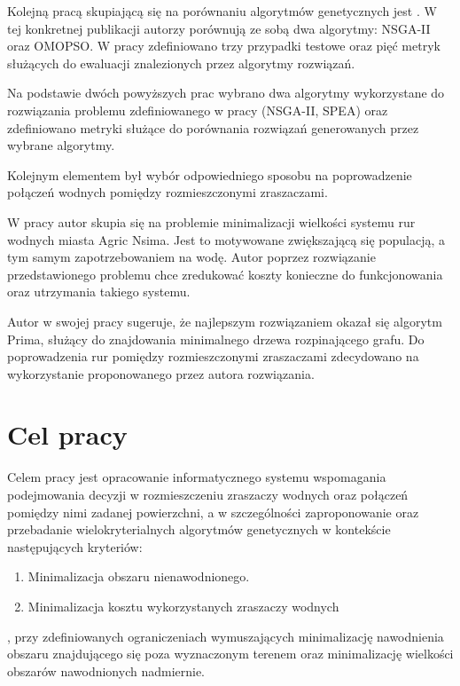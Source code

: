 \documentclass[twoside]{iisthesis}
\begin{document}
Kolejną pracą skupiającą się na porównaniu algorytmów genetycznych jest \cite{comparison_2}. W tej konkretnej publikacji autorzy porównują ze sobą dwa algorytmy: NSGA-II oraz OMOPSO. W pracy zdefiniowano trzy przypadki testowe oraz pięć metryk służących do ewaluacji znalezionych przez algorytmy rozwiązań.

Na podstawie dwóch powyższych prac wybrano dwa algorytmy wykorzystane do rozwiązania problemu zdefiniowanego w pracy (NSGA-II, SPEA) oraz zdefiniowano metryki służące do porównania rozwiązań generowanych przez wybrane algorytmy.

Kolejnym elementem był wybór odpowiedniego sposobu na poprowadzenie połączeń wodnych pomiędzy rozmieszczonymi zraszaczami.

W pracy \cite{pipes} autor skupia się na problemie minimalizacji wielkości systemu rur wodnych miasta Agric Nsima. Jest to motywowane zwiększającą się populacją, a tym samym zapotrzebowaniem na wodę. Autor poprzez rozwiązanie przedstawionego problemu chce zredukować koszty konieczne do funkcjonowania oraz utrzymania takiego systemu.

Autor w swojej pracy sugeruje, że najlepszym rozwiązaniem okazał się algorytm Prima, służący do znajdowania minimalnego drzewa rozpinającego grafu. Do poprowadzenia rur pomiędzy rozmieszczonymi zraszaczami zdecydowano na wykorzystanie proponowanego przez autora rozwiązania.

\section{Cel pracy}
Celem pracy jest opracowanie informatycznego systemu wspomagania podejmowania decyzji w rozmieszczeniu zraszaczy wodnych oraz połączeń pomiędzy nimi zadanej powierzchni, a w szczególności zaproponowanie oraz przebadanie wielokryterialnych algorytmów genetycznych w kontekście następujących kryteriów:\\
\begin{enumerate}
	\item Minimalizacja obszaru nienawodnionego.
	\item Minimalizacja kosztu wykorzystanych zraszaczy wodnych\\
\end{enumerate}
, przy zdefiniowanych ograniczeniach wymuszających minimalizację nawodnienia obszaru znajdującego się poza wyznaczonym terenem oraz minimalizację wielkości obszarów nawodnionych nadmiernie.
\end{document}
